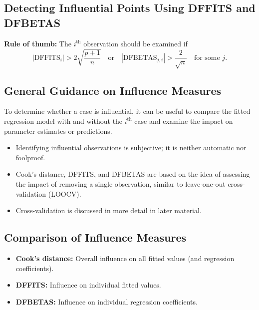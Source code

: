 \subsection{Detecting Influential Points Using DFFITS and DFBETAS}

\begin{keyresult}
\textbf{Rule of thumb:} The $i^{\text{th}}$ observation should be examined if
\[
|\text{DFFITS}_i| > 2\sqrt{\frac{p+1}{n}}
\quad \text{or} \quad
|\text{DFBETAS}_{j,i}| > \frac{2}{\sqrt{n}}
\quad \text{for some } j.
\]
\end{keyresult}

\subsection{General Guidance on Influence Measures}

To determine whether a case is influential, it can be useful to compare the fitted regression model with and without the $i^{\text{th}}$ case and examine the impact on parameter estimates or predictions.

\begin{notebox}
\begin{itemize}
\item Identifying influential observations is subjective; it is neither automatic nor foolproof.

\item Cook's distance, DFFITS, and DFBETAS are based on the idea of assessing the impact of removing a single observation, similar to leave-one-out cross-validation (LOOCV).

\item Cross-validation is discussed in more detail in later material.
\end{itemize}
\end{notebox}

\subsection{Comparison of Influence Measures}

\begin{notebox}
\begin{itemize}
\item \textbf{Cook's distance:} Overall influence on all fitted values (and regression coefficients).

\item \textbf{DFFITS:} Influence on individual fitted values.

\item \textbf{DFBETAS:} Influence on individual regression coefficients.
\end{itemize}
\end{notebox}

